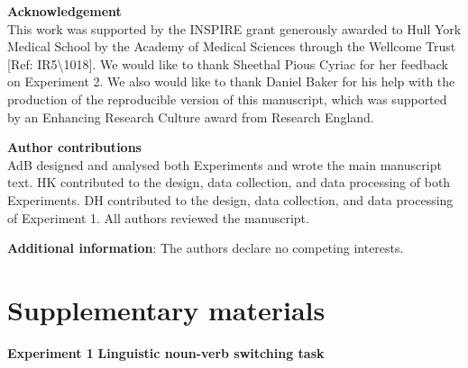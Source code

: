 \documentclass[
]{article}
\begin{document}
\newpage

\textbf{Acknowledgement}\\
This work was supported by the INSPIRE grant generously awarded to Hull York Medical School by the Academy of Medical Sciences through the Wellcome Trust {[}Ref: IR5\textbackslash1018{]}. We would like to thank Sheethal Pious Cyriac for her feedback on Experiment 2. We also would like to thank Daniel Baker for his help with the production of the reproducible version of this manuscript, which was supported by an Enhancing Research Culture award from Research England.

\textbf{Author contributions}\\
AdB designed and analysed both Experiments and wrote the main manuscript text. HK contributed to the design, data collection, and data processing of both Experiments. DH contributed to the design, data collection, and data processing of Experiment 1. All authors reviewed the manuscript.

\textbf{Additional information}:
The authors declare no competing interests.

\setcounter{table}{0} \renewcommand{\thetable}{S\arabic{table}} \setcounter{figure}{0} \renewcommand{\thefigure}{S\arabic{figure}}

\newpage

\hypertarget{supplementary-materials}{%
\section{Supplementary materials}\label{supplementary-materials}}

\textbf{Experiment 1}
\textbf{Linguistic noun-verb switching task}
\end{document}
